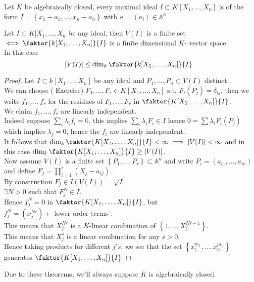 \documentclass[../main.tex]{subfiles}
\begin{document}
\begin{thm}
	Let $K$ be algebraically closed, every maximal ideal $I \subset K[X_1,\ldots, X_n]$ is of the form $ I= \left\{ x_1-a_1,\ldots, x_n-a_n \right\} $ with $a= ( a_i) \in \mathbb{A}^{n}$ 
\end{thm}
\begin{crly}
	Let $I \subset K[X_1,\ldots, X_n$ be any ideal, then $V( I) $ is a finite set $\iff \faktor { k[X_1,\ldots, X_n]} { I} $ is a finite dimensional $K$- vector space.\\
	In this case
	\[ 
	|V( I) | \leq \dim_k \faktor { k[X_1,\ldots, X_n]} { I}
	\]
\end{crly}
\begin{proof}
	Let $I \subset k[X_1,\ldots, X_n]$ be any ideal and $P_1, \ldots, P_n \subset V( I) $ distinct.\\
	We can choose ( Exercise) $F_1,\ldots, F_r \in K[X_1,\ldots, X_n]$ s.t. $F_i( P_j) = \delta_{ij} $, then we write $f_1,\ldots, f_r$ for the residues of $F_1,\ldots, F_r$ in $\faktor{  K[X_1,\ldots, X_n] } { I} $.\\
	We claim $f_1,\ldots, f_r$ are linearly independent.\\
	Indeed suppose $\sum_i \lambda_i f_i = 0$, this implies $ \sum_i \lambda_i F_i \in I$ hence $0 = \sum \lambda_i F_i( P_j) $ which implies $\lambda_j = 0 $, hence the $f_i$ are linearly independent.\\
	It follows that $\dim_k \faktor{  K[X_1,\ldots, X_n] } { I} < \infty \implies |V( I) | < \infty $ and in this case $\dim_k \faktor{  K[X_1,\ldots, X_n] } { I} \geq |V( I) |$.\\
	Now assume $V( I) $ is a finite set $ \left\{ P_1,\ldots, P_r \right\} \subset \mathbb{A}^{n}$ and write $P_i = ( a_{i1}, \ldots, a_{in}  ) $ and define $F_j= \prod_{i =1}^{r}( X_j- a_{ij} ) $.\\
	By construction $F_j\in I( V( I) )= \sqrt{I}  $\\
	$\exists N>0$ such that $F_j^{N}\in I$.\\
	Hence $f_j^{N}=0$ in $\faktor{  K[X_1,\ldots, X_n] } { I} $, but $f_j^{N}= ( x_j^{Nr}) +  \text{ lower order terms } 	$.\\
	This means that $X_j^{Nr}$ is a $K$-linear combination of $ \left\{ 1,\ldots, X_j^{Nr-1} \right\} $.\\
	This means that $X_j^{s}$ is a linear combination for any $s>0$.\\
	Hence taking products for different $j's$, we see that the set $ \left\{ x_1^{m_1},\ldots, x_n^{m_n} \right\} $ generates $ \faktor{  K[X_1,\ldots, X_n] } { I}$ 
\end{proof}
Due to these theorems, we'll always suppose $K$ is algebraically closed.






		
\end{document}

